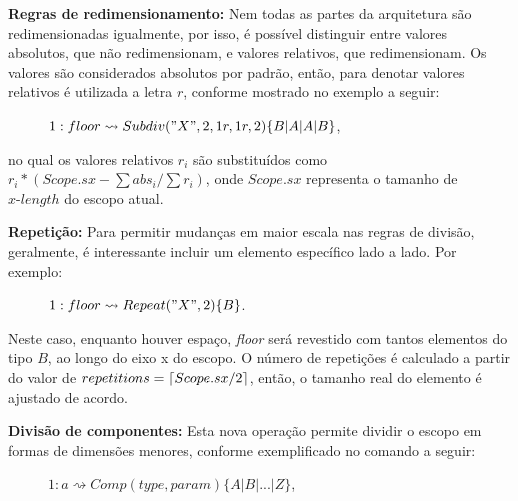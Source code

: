 \textbf{Regras de redimensionamento:} Nem todas as partes da arquitetura são redimensionadas igualmente, por isso, é possível distinguir entre valores absolutos, que não redimensionam, e valores relativos, que redimensionam. Os valores são considerados absolutos por padrão, então, para denotar valores relativos é utilizada a letra $r$, conforme mostrado no exemplo a seguir:

\vspace{0.5cm}

\begin{description}
    \item[] \qquad \qquad $1: floor \rightsquigarrow Subdiv("X",2,1r,1r,2) \{ B | A | A | B \}$,
\end{description}

\vspace{0.5cm}

\noindent no qual os valores relativos $r_i$ são substituídos como $r_i * (Scope.sx - \sum abs_i / \sum r_i)$, onde $Scope.sx$ representa o tamanho de $x\mbox{-}length$ do escopo atual.

\textbf{Repetição:} Para permitir mudanças em maior escala nas regras de divisão, geralmente, é interessante incluir um elemento específico lado a lado. Por exemplo:

\vspace{0.5cm}

\begin{description}
    \item[] \qquad \qquad $1: floor \rightsquigarrow Repeat("X",2) \{ B \}$.
\end{description}

\vspace{0.5cm}

Neste caso, enquanto houver espaço, \textit{floor} será revestido com tantos elementos do tipo $B$, ao longo do eixo x do escopo. O número de repetições é calculado a partir do valor de $repetitions = \left\lceil Scope.sx/2 \right\rceil$, então, o tamanho real do elemento é ajustado de acordo.

\textbf{Divisão de componentes:} Esta nova operação permite dividir o escopo em formas de dimensões menores, conforme exemplificado no comando a seguir:

\vspace{0.5cm}

\begin{description}
    \item[] \qquad \qquad $1: a \rightsquigarrow Comp(type, param) \{ A | B | ... | Z \}$,
\end{description}


